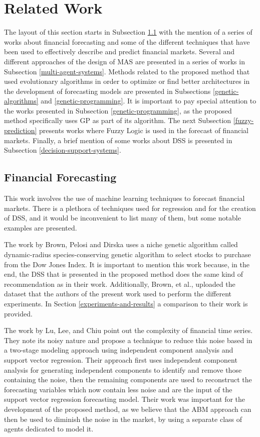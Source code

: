 \documentclass[12pt,journal,compsoc]{IEEEtran}
\begin{document}
\section{Related Work}
\label{related-work}

The layout of this section starts in Subsection \ref{financial-forecasting} with the mention of a series of works about financial forecasting and some of the different techniques that have been used to effectively describe and predict financial markets. Several and different approaches of the design of MAS are presented in a series of works in Subsection \ref{multi-agent-systems}. Methods related to the proposed method that used evolutionary algorithms in order to optimize or find better architectures in the development of forecasting models are presented in Subsections \ref{genetic-algorithms} and \ref{genetic-programming}. It is important to pay special attention to the works presented in Subsection \ref{genetic-programming}, as the proposed method specifically uses GP as part of its algorithm. The next Subsection \ref{fuzzy-prediction} presents works where Fuzzy Logic is used in the forecast of financial markets. Finally, a brief mention of some works about DSS is presented in Subsection \ref{decision-support-systems}.

\subsection{Financial Forecasting}
\label{financial-forecasting}

This work involves the use of machine learning techniques to forecast financial markets. There is a plethora of techniques used for regression and for the creation of DSS, and it would be inconvenient to list many of them, but some notable examples are presented.

The work by Brown, Pelosi and Dirska \cite{brown2013dynamic} uses a niche genetic algorithm called dynamic-radius species-conserving genetic algorithm to select stocks to purchase from the Dow Jones Index. It is important to mention this work because, in the end, the DSS that is presented in the proposed method does the same kind of recommendation as in their work. Additionally, Brown, et al., uploaded the dataset that the authors of the present work used to perform the different experiments. In Section \ref{experiments-and-results} a comparison to their work is provided.

The work by Lu, Lee, and Chiu \cite{Lu2009} point out the complexity of financial time series. They note its noisy nature and propose a technique to reduce this noise based in a two-stage modeling approach using independent component analysis and support vector regression. Their approach first uses independent component analysis for generating independent components to identify and remove those containing the noise, then the remaining components are used to reconstruct the forecasting variables which now contain less noise and are the input of the support vector regression forecasting model. Their work was important for the development of the proposed method, as we believe that the ABM approach can then be used to diminish the noise in the market, by using a separate class of agents dedicated to model it.
\end{document}
